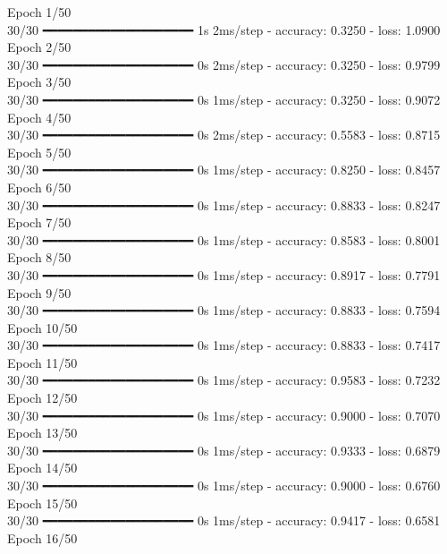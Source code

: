 \documentclass{article}
\begin{document}
Epoch 1/50 \\
30/30 ━━━━━━━━━━━━━━━━━━━━ 1s 2ms/step - accuracy: 0.3250 - loss: 1.0900 \\
Epoch 2/50 \\
30/30 ━━━━━━━━━━━━━━━━━━━━ 0s 2ms/step - accuracy: 0.3250 - loss: 0.9799 \\
Epoch 3/50 \\
30/30 ━━━━━━━━━━━━━━━━━━━━ 0s 1ms/step - accuracy: 0.3250 - loss: 0.9072 \\
Epoch 4/50 \\
30/30 ━━━━━━━━━━━━━━━━━━━━ 0s 2ms/step - accuracy: 0.5583 - loss: 0.8715 \\
Epoch 5/50 \\
30/30 ━━━━━━━━━━━━━━━━━━━━ 0s 1ms/step - accuracy: 0.8250 - loss: 0.8457 \\
Epoch 6/50 \\
30/30 ━━━━━━━━━━━━━━━━━━━━ 0s 1ms/step - accuracy: 0.8833 - loss: 0.8247 \\
Epoch 7/50 \\
30/30 ━━━━━━━━━━━━━━━━━━━━ 0s 1ms/step - accuracy: 0.8583 - loss: 0.8001 \\
Epoch 8/50 \\
30/30 ━━━━━━━━━━━━━━━━━━━━ 0s 1ms/step - accuracy: 0.8917 - loss: 0.7791 \\
Epoch 9/50 \\
30/30 ━━━━━━━━━━━━━━━━━━━━ 0s 1ms/step - accuracy: 0.8833 - loss: 0.7594 \\
Epoch 10/50 \\
30/30 ━━━━━━━━━━━━━━━━━━━━ 0s 1ms/step - accuracy: 0.8833 - loss: 0.7417 \\
Epoch 11/50 \\
30/30 ━━━━━━━━━━━━━━━━━━━━ 0s 1ms/step - accuracy: 0.9583 - loss: 0.7232 \\
Epoch 12/50 \\
30/30 ━━━━━━━━━━━━━━━━━━━━ 0s 1ms/step - accuracy: 0.9000 - loss: 0.7070 \\
Epoch 13/50 \\
30/30 ━━━━━━━━━━━━━━━━━━━━ 0s 1ms/step - accuracy: 0.9333 - loss: 0.6879 \\
Epoch 14/50 \\
30/30 ━━━━━━━━━━━━━━━━━━━━ 0s 1ms/step - accuracy: 0.9000 - loss: 0.6760 \\
Epoch 15/50 \\
30/30 ━━━━━━━━━━━━━━━━━━━━ 0s 1ms/step - accuracy: 0.9417 - loss: 0.6581 \\
Epoch 16/50 \\
\end{document}

